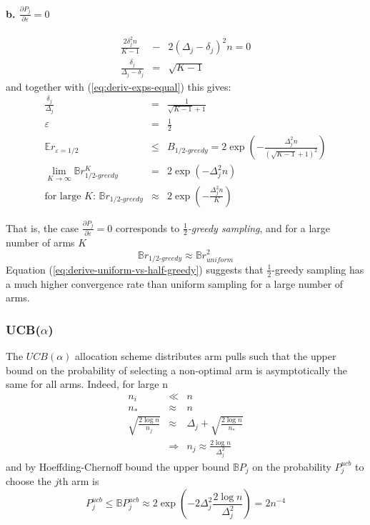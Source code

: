 \documentclass{article}
\newcommand {\IE} {\ensuremath {\mathbb{E}}}
\begin{document}
\paragraph{b. {\large $\frac {\partial P_j} {\partial \varepsilon}=0$}}

\begin{eqnarray*}
\frac {2\delta_j^2 n} {K-1}
  &-& 2(\Delta_j-\delta_j)^2n=0\\
\frac {\delta_j} {\Delta_j-\delta_j}&=&\sqrt {K-1}
\end{eqnarray*}
and together with (\ref{eq:deriv-exps-equal}) this gives:
\begin{eqnarray}
\frac {\delta_j} {\Delta_j}&=&\frac 1 {\sqrt {K-1}+1}\nonumber\\
\varepsilon&=&\frac 1 2\nonumber\\
\IE
r_{\varepsilon=1/2}&\le&B_{1/2\mbox{-}greedy}=2\exp\left(-\frac
  {\Delta_j^2n} {(\sqrt{K-1}+1)^2}\right)\nonumber\\
\lim_{K\to\infty}
\mathbb{B}r_{1/2\mbox{-}greedy}^K&=&2\exp\left(-{\Delta_j^2n}\right)\nonumber\\
\mbox{for large $K$: }\mathbb{B}r_{1/2\mbox{-}greedy}&\approx&2\exp\left(-\frac {\Delta_j^2n} K\right)
\label{eq:deriv-half-greedy-sampling}
\end{eqnarray}

That is, the case $\frac {\partial P_j} {\partial \varepsilon}=0$
corresponds to \emph{$\frac 1 2$-greedy sampling}, and for a large number of
arms $K$ 
\begin{equation}
\mathbb{B}r_{1/2\mbox{-}greedy}\approx \mathbb{B}r_{uniform}^2
\label{eq:derive-uniform-vs-half-greedy}
\end{equation}
Equation (\ref{eq:derive-uniform-vs-half-greedy}) suggests that
$\frac 1 2$-greedy sampling has a much higher convergence rate than uniform
sampling for a large number of arms.

\subsubsection{UCB($\alpha$)}
\label{app:derivations-asym-ucb}

The $UCB(\alpha)$ allocation scheme distributes arm pulls such that
the upper bound on the probability of selecting a non-optimal arm is
asymptotically the same for all arms. Indeed, for large n
\begin{eqnarray}
n_i&\ll&n\\
n_*&\approx&n\\
\sqrt {\frac {2 \log n} {n_j}}&\approx&\Delta_j+\sqrt {\frac {2\log n}
  {n_*}} \\
&\Rightarrow& n_j \approx \frac {2\log n} {\Delta_j^2}
\label{eq:deriv-ucb-asymptotic-nj}
\end{eqnarray}
and by Hoeffding-Chernoff bound the upper bound $\mathbb{B}P_j$ on the probability
$P_j^{ucb}$ to choose the $j$th arm is
\begin{equation}
P_j^{ucb}\le\mathbb{B}P_j^{ucb}\approx2\exp\left(-2\Delta_j^2\frac {2\log n}{\Delta_j^2}\right)
             =2n^{-4}
\end{equation}
\end{document}
